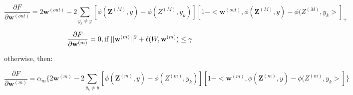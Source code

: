 \begin{equation}
\frac{\partial F}{\partial \textbf{w}^{(out)}} = 2\textbf{w}^{(out)} - 2\sum\limits_{y_k \neq y}[\phi(\textbf{Z}^{(M)},y) - \phi({Z}^{(M)},y_k)][1 - <\textbf{w}^{(out)}, \phi(\textbf{Z}^{(M)},y) - \phi({Z}^{(M)},y_k>]_+
\end{equation}

\begin{equation}
\frac{\partial F}{\partial \textbf{w}^{(m)}} = 0, \text{if ||\textbf{w}$^{(m)}||^2 + \ell(W,\textbf{w}^{(m)}) \leq \gamma $}
\end{equation}

otherwise, then:

\begin{equation}
\frac{\partial F}{\partial \textbf{w}^{(m)}} =
\alpha_m\{2\textbf{w}^{(m)}-2\sum\limits_{y_k \neq y}[\phi(\textbf{Z}^{(m)},y) - \phi({Z}^{(m)},y_k)][1 - <\textbf{w}^{(m)}, \phi(\textbf{Z}^{(m)},y) - \phi({Z}^{(m)},y_k>] \}
\end{equation}



%

